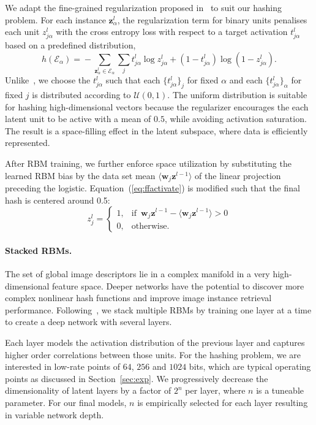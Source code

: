 \documentclass[10pt,twocolumn,letterpaper]{article}
\begin{document}
We adapt the fine-grained regularization proposed in~\cite{hanlinSparsity} to suit our hashing problem. For each instance $\mathbf{z}^{l}_{\alpha}$, the regularization term for binary units penalises each unit $z_{j\alpha}^{l}$ with the cross entropy loss with respect to a target activation $t_{j\alpha}^{l}$ based on a predefined distribution,
\begin{equation}
h(\mathcal{E}_{\alpha})\!=\!-\!\!\!\!\sum_{\mathbf{z}^{l}_{\alpha}\in\mathcal{E}_{\alpha}}\!\!\!\sum_{j} t^{l}_{j\alpha}\log z^{l}_{j\alpha}\!+(1-t^{l}_{j\alpha})\log(1-z^{l}_{j\alpha}).\!\!
\end{equation}
Unlike~\cite{hanlinSparsity}, we choose the $t_{j\alpha}^{l}$ such that each $\{t_{j\alpha}^{l}\}_{j}$ for fixed $\alpha$ 
and each $\{t_{j\alpha}^{l}\}_{\alpha}$ for fixed $j$ is distributed according to $\mathcal{U}(0,1)$.
The uniform distribution is suitable for hashing high-dimensional vectors because the regularizer encourages the each latent unit to be active with a mean of $0.5$, while avoiding activation saturation. The result is a space-filling effect in the latent subspace, where data is efficiently represented.

After RBM training, we further enforce space utilization by substituting the learned RBM bias by the data set mean $\langle\mathbf{w}_{j} \mathbf{z}^{l-1}\rangle$ of the linear projection preceding the logistic. 
Equation~(\ref{eq:ffactivate}) is modified such that the final hash is centered around 0.5:
\begin{equation}
z^{l}_j=\begin{cases}
1,& \text{if } \,\mathbf{w}_{j} \mathbf{z}^{l-1}\!-\!\langle\mathbf{w}_{j} \mathbf{z}^{l-1}\rangle\!>\!0\\
    0,              & \text{otherwise}.
\end{cases}
\label{eq:biastrick}
\end{equation}


\paragraph{Stacked RBMs.}
The set of global image descriptors lie in a complex manifold in a very high-dimensional feature space. Deeper networks have the potential to discover more complex nonlinear hash functions and improve image instance retrieval performance. Following~\cite{HintonDBN}, we stack multiple RBMs by training one layer at a time to create a deep network with several layers.

Each layer models the activation distribution of the previous layer and captures higher order correlations between those units. 
For the hashing problem, we are interested in low-rate points of $64$, $256$ and $1024$ bits, which are typical operating points as discussed in Section~\ref{sec:exp}. 
We progressively decrease the dimensionality of latent layers by a factor of $2^{n}$ per layer, where $n$ is a tuneable parameter.
For our final models, $n$ is empirically selected for each layer resulting in variable network depth.
\end{document}
